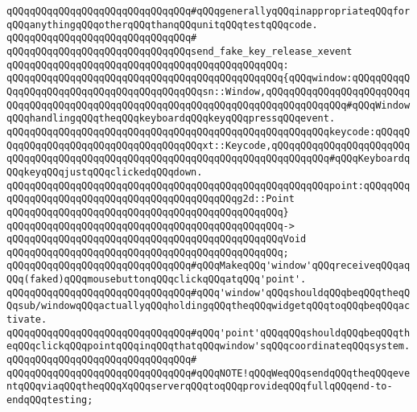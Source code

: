 \verb|qQQqqQQqqQQqqQQqqQQqqQQqqQQqqQQq#qQQqgenerallyqQQqinappropriateqQQqforqQQqanythingqQQqotherqQQqthanqQQqunitqQQqtestqQQqcode.|\newline
\verb|qQQqqQQqqQQqqQQqqQQqqQQqqQQqqQQq#|\newline
\verb|qQQqqQQqqQQqqQQqqQQqqQQqqQQqqQQqsend_fake_key_release_xevent|\newline
\verb|qQQqqQQqqQQqqQQqqQQqqQQqqQQqqQQqqQQqqQQqqQQqqQQq:|\newline
\verb|qQQqqQQqqQQqqQQqqQQqqQQqqQQqqQQqqQQqqQQqqQQqqQQq{qQQqwindow:qQQqqQQqqQQqqQQqqQQqqQQqqQQqqQQqqQQqqQQqqQQqsn::Window,qQQqqQQqqQQqqQQqqQQqqQQqqQQqqQQqqQQqqQQqqQQqqQQqqQQqqQQqqQQqqQQqqQQqqQQqqQQqqQQqqQQq#qQQqWindowqQQqhandlingqQQqtheqQQqkeyboardqQQqkeyqQQqpressqQQqevent.|\newline
\verb|qQQqqQQqqQQqqQQqqQQqqQQqqQQqqQQqqQQqqQQqqQQqqQQqqQQqqQQqkeycode:qQQqqQQqqQQqqQQqqQQqqQQqqQQqqQQqqQQqqQQqxt::Keycode,qQQqqQQqqQQqqQQqqQQqqQQqqQQqqQQqqQQqqQQqqQQqqQQqqQQqqQQqqQQqqQQqqQQqqQQqqQQqqQQq#qQQqKeyboardqQQqkeyqQQqjustqQQqclickedqQQqdown.|\newline
\verb|qQQqqQQqqQQqqQQqqQQqqQQqqQQqqQQqqQQqqQQqqQQqqQQqqQQqqQQqpoint:qQQqqQQqqQQqqQQqqQQqqQQqqQQqqQQqqQQqqQQqqQQqqQQqg2d::Point|\newline
\verb|qQQqqQQqqQQqqQQqqQQqqQQqqQQqqQQqqQQqqQQqqQQqqQQq}|\newline
\verb|qQQqqQQqqQQqqQQqqQQqqQQqqQQqqQQqqQQqqQQqqQQqqQQq->|\newline
\verb|qQQqqQQqqQQqqQQqqQQqqQQqqQQqqQQqqQQqqQQqqQQqqQQqVoid|\newline
\verb|qQQqqQQqqQQqqQQqqQQqqQQqqQQqqQQqqQQqqQQqqQQqqQQq;|\newline
\newline
\verb|qQQqqQQqqQQqqQQqqQQqqQQqqQQqqQQq#qQQqMakeqQQq'window'qQQqreceiveqQQqaqQQq(faked)qQQqmousebuttonqQQqclickqQQqatqQQq'point'.|\newline
\verb|qQQqqQQqqQQqqQQqqQQqqQQqqQQqqQQq#qQQq'window'qQQqshouldqQQqbeqQQqtheqQQqsub/windowqQQqactuallyqQQqholdingqQQqtheqQQqwidgetqQQqtoqQQqbeqQQqactivate.|\newline
\verb|qQQqqQQqqQQqqQQqqQQqqQQqqQQqqQQq#qQQq'point'qQQqqQQqshouldqQQqbeqQQqtheqQQqclickqQQqpointqQQqinqQQqthatqQQqwindow'sqQQqcoordinateqQQqsystem.|\newline
\verb|qQQqqQQqqQQqqQQqqQQqqQQqqQQqqQQq#|\newline
\verb|qQQqqQQqqQQqqQQqqQQqqQQqqQQqqQQq#qQQqNOTE!qQQqWeqQQqsendqQQqtheqQQqeventqQQqviaqQQqtheqQQqXqQQqserverqQQqtoqQQqprovideqQQqfullqQQqend-to-endqQQqtesting;|\newline
